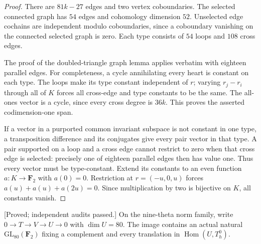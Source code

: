 \begin{proof}
There are $81k-27$ edges and two vertex coboundaries. The selected
connected graph has $54$ edges and cohomology dimension $52$.
Unselected edge cochains are independent modulo coboundaries,
since a coboundary vanishing on the connected selected graph is
zero. Each type consists of $54$ loops and $108$ cross edges.

The proof of the doubled-triangle graph lemma applies verbatim
with eighteen parallel edges. For completeness, a cycle annihilating
every heart is constant on each type. The loops make its type
constant independent of $r$; varying $r_j-r_i$ through all of $K$
forces all cross-edge and type constants to be the same. The
all-ones vector is a cycle, since every cross degree is $36k$.
This proves the asserted codimension-one span.

If a vector in a purported common invariant subspace is not
constant in one type, a transposition difference and its conjugates
give every pair vector in that type. A pair supported on a loop
and a cross edge cannot restrict to zero when that cross edge is
selected: precisely one of eighteen parallel edges then has value
one. Thus every vector must be type-constant. Extend its constants
to an even function $a:K\to\mathbf F_2$ with $a(0)=0$.
Restriction at $r=(-u,0,u)$ forces
$a(u)+a(u)+a(2u)=0$. Since multiplication by two is bijective on
$K$, all constants vanish.
\end{proof}

\begin{proposition}
\label{prop:nine-theta-full-gluing-candidate}
\textup{[Proved; independent audits passed.]}
On the nine-theta norm family, write
$0\to T\to V\to U\to0$ with $\dim U=80$.
The image contains an actual natural $\mathrm{GL}_{80}(\mathbf F_2)$
fixing a complement and every translation in $\operatorname{Hom}(U,T_h^0)$.
\end{proposition}

